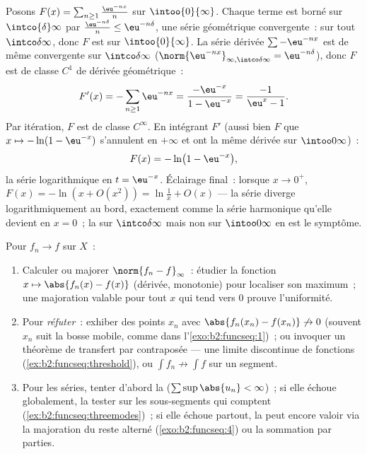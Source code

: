 \begin{example}\label{ex:b2:funcseq:logseries}
Posons $F(x) = \sum_{n\geq1} \frac{\eu^{-nx}}{n}$ sur
$\intoo{0}{\infty}$. Chaque terme est borné sur $\intco{\delta}
\infty$ par $\frac{\eu^{-n\delta}}{n} \leq \eu^{-n\delta}$, une
série géométrique convergente~:  sur tout
$\intco\delta\infty$, donc $F$ est  sur
$\intoo{0}{\infty}$. La série dérivée $\sum -\eu^{-nx}$ est
de même  convergente sur $\intco\delta\infty$
($\norm{\eu^{-nx}}_{\infty,\intco\delta\infty} =
\eu^{-n\delta}$), donc $F$ est de classe $C^1$ de dérivée géométrique~:
\[
F'(x) = -\sum_{n\geq1}\eu^{-nx}
= \frac{-\eu^{-x}}{1 - \eu^{-x}}
= \frac{-1}{\eu^{x} - 1} .
\]
Par itération, $F$ est de classe $C^\infty$. En intégrant $F'$ (aussi
bien $F$ que $x \mapsto -\ln(1 - \eu^{-x})$ s'annulent en $+\infty$ et
ont la même dérivée sur $\intoo0\infty$)~:
\[
F(x) = -\ln\bigl(1 - \eu^{-x}\bigr),
\]
la série logarithmique en $t = \eu^{-x}$. Éclairage final~: lorsque $x
\to 0^+$, $F(x) = -\ln(x + O(x^2)) = \ln\frac1x + O(x)$ --- la
série diverge logarithmiquement au bord, exactement comme la série
harmonique qu'elle devient en $x = 0$~; la  sur
$\intco\delta\infty$ mais non sur $\intoo0\infty$ en est le
symptôme.
\end{example}

\begin{method}\label{met:b2:funcseq:uniform}
Pour $f_n \to f$  sur $X$~:
\begin{enumerate}
  \item Calculer ou majorer $\norm{f_n - f}_\infty$~: étudier la
        fonction $x \mapsto \abs{f_n(x) - f(x)}$ (dérivée,
        monotonie) pour localiser son maximum~; une majoration
        valable pour tout $x$ qui tend vers $0$ prouve l'uniformité.
  \item Pour \emph{réfuter}~: exhiber des points $x_n$ avec
        $\abs{f_n(x_n) - f(x_n)} \not\to 0$ (souvent $x_n$ suit
        la bosse mobile, comme dans l'\cref{exo:b2:funcseq:1})~; ou
        invoquer un théorème de transfert par contraposée --- une
        limite discontinue de fonctions 
        (\cref{ex:b2:funcseq:threshold}), ou $\int f_n
        \not\to \int f$ sur un segment.
  \item Pour les séries, tenter d'abord la 
        ($\sum\sup\abs{u_n} < \infty$)~; si elle échoue globalement,
        la tester sur les sous-segments qui comptent
        (\cref{ex:b2:funcseq:threemodes})~; si elle échoue
        partout, la  peut encore valoir via la
        majoration du reste alterné
        (\cref{exo:b2:funcseq:4}) ou la sommation par parties.
\end{enumerate}
\end{method}

